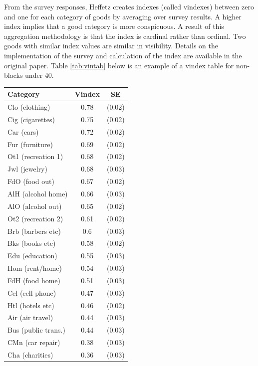 \documentclass{article}
\begin{document}
From the survey responses, Heffetz creates indexes (called vindexes) between zero and one for each category of goods by averaging over survey results.  
A higher index implies that a good category is  more conspicuous. 
A result of this aggregation methodology is that the index is cardinal rather than ordinal.  Two goods with similar index values are similar in visibility.  Details on the implementation of the survey and calculation of the index are available in the original paper.
Table \ref{tab:vintab} below is an example of a vindex table for non-blacks under 40.

\begin{table}
	\begin{center}
\begin{tabular}{|l|c|c|}
	\hline
	\textbf{Category} & \textbf{Vindex} & \textbf{SE} \\
	\hline
Clo (clothing) & 0.78 & (0.02)\\ 
	\hline
Cig (cigarettes) & 0.75 & (0.02)\\ 
	\hline
Car (cars) & 0.72 & (0.02)\\ 
	\hline
Fur (furniture) & 0.69 & (0.02)\\ 
	\hline
Ot1 (recreation 1) & 0.68 & (0.02)\\ 
	\hline
Jwl (jewelry) & 0.68 & (0.03)\\ 
	\hline
FdO (food out) & 0.67 & (0.02)\\ 
	\hline
AlH (alcohol home) & 0.66 & (0.03)\\ 
	\hline
AlO (alcohol out) & 0.65 & (0.02)\\ 
	\hline
Ot2 (recreation 2) & 0.61 & (0.02)\\ 
	\hline
Brb (barbers etc) & 0.6 & (0.03)\\ 
	\hline
Bks (books etc) & 0.58 & (0.02)\\ 
	\hline
Edu (education) & 0.55 & (0.03)\\ 
	\hline
Hom (rent/home) & 0.54 & (0.03)\\ 
	\hline
FdH (food home) & 0.51 & (0.03)\\ 
	\hline
Cel (cell phone) & 0.47 & (0.03)\\ 
	\hline
Htl (hotels etc) & 0.46 & (0.02)\\ 
	\hline
Air (air travel) & 0.44 & (0.03)\\ 
	\hline
Bus (public trans.) & 0.44 & (0.03)\\ 
	\hline
CMn (car repair) & 0.38 & (0.03)\\ 
	\hline
Cha (charities) & 0.36 & (0.03)\\ 

\end{tabular}
\end{center}
\end{table}
\end{document}
